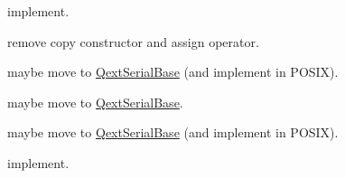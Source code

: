 
\begin{DoxyRefList}
\item[\label{todo__todo000001}%
\Hypertarget{todo__todo000001}%
Member \mbox{\hyperlink{class_qext_serial_base_abc9dc7c9a7735476800eb5aa35bec6a8}{Qext\+Serial\+Base\+:\+:dsr\+Changed}} (bool status)]implement.  
\item[\label{todo__todo000002}%
\Hypertarget{todo__todo000002}%
Class \mbox{\hyperlink{class_win___qext_serial_port}{Win\+\_\+\+Qext\+Serial\+Port}} ]remove copy constructor and assign operator.  
\item[\label{todo__todo000004}%
\Hypertarget{todo__todo000004}%
Member \mbox{\hyperlink{class_win___qext_serial_port_a8e701bb9ef9ca4ff414b0cc89788fcab}{Win\+\_\+\+Qext\+Serial\+Port\+:\+:\+\_\+bytes\+To\+Write}} ]maybe move to \mbox{\hyperlink{class_qext_serial_base}{Qext\+Serial\+Base}} (and implement in P\+O\+S\+IX).  
\item[\label{todo__todo000003}%
\Hypertarget{todo__todo000003}%
Member \mbox{\hyperlink{class_win___qext_serial_port_a9dc5b1cba88ecda500921baf1cbe61a0}{Win\+\_\+\+Qext\+Serial\+Port\+:\+:bytes\+To\+Write\+Lock}} ]maybe move to \mbox{\hyperlink{class_qext_serial_base}{Qext\+Serial\+Base}}.  
\item[\label{todo__todo000005}%
\Hypertarget{todo__todo000005}%
Member \mbox{\hyperlink{class_win___qext_serial_port_a9edfed65b7763c69d775a181c361e461}{Win\+\_\+\+Qext\+Serial\+Port\+:\+:overlap\+Thread}} ]maybe move to \mbox{\hyperlink{class_qext_serial_base}{Qext\+Serial\+Base}} (and implement in P\+O\+S\+IX).  
\item[\label{todo__todo000006}%
\Hypertarget{todo__todo000006}%
Member \mbox{\hyperlink{class_win___qext_serial_port_aa089a2a66d8d4fa3a3ce4c99c9c7e30f}{Win\+\_\+\+Qext\+Serial\+Port\+:\+:wait\+For\+Ready\+Read}} (int msecs)]implement. 
\end{DoxyRefList}